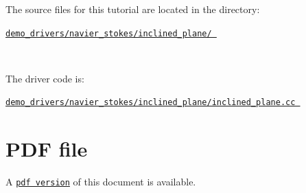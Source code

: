 \begin{DoxyItemize}
\item The source files for this tutorial are located in the directory\+:~\newline
~\newline
\begin{center} \href{../../../../demo_drivers/navier_stokes/inclined_plane/}{\tt demo\+\_\+drivers/navier\+\_\+stokes/inclined\+\_\+plane/ } \end{center} ~\newline

\item The driver code is\+: ~\newline
~\newline
\begin{center} \href{../../../../demo_drivers/navier_stokes/inclined_plane/inclined_plane.cc}{\tt demo\+\_\+drivers/navier\+\_\+stokes/inclined\+\_\+plane/inclined\+\_\+plane.\+cc } \end{center} 
\end{DoxyItemize}



 

 \hypertarget{index_pdf}{}\section{P\+D\+F file}\label{index_pdf}
A \href{../latex/refman.pdf}{\tt pdf version} of this document is available. 
